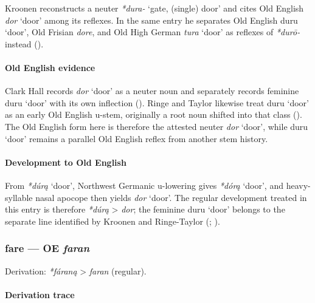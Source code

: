 \documentclass[
  british,
  a4paper,
]{article}
\providecommand{\Recon}[1]{\emph{*#1}}
\begin{document}
Kroonen reconstructs a neuter \emph{*dura-} `gate, (single) door' and
cites Old English {\emph{dor}} `door' among its reflexes. In the same
entry he separates Old English {duru} `door', Old Frisian \emph{dore},
and Old High German {\emph{tura}} `door' as reflexes of \emph{*durō-}
instead ().

\paragraph{Old English evidence}\label{old-english-evidence-16}

Clark Hall records {\emph{dor}} `door' as a neuter noun and separately
records feminine {duru} `door' with its own inflection
(). Ringe and Taylor
likewise treat {duru} `door' as an early Old English u-stem, originally
a root noun shifted into that class
(). The Old English
form here is therefore the attested neuter {\emph{dor}} `door', while
{duru} `door' remains a parallel Old English reflex from another stem
history.

\paragraph{Development to Old
English}\label{development-to-old-english-16}

From \Recon{dúrą} `door', Northwest Germanic u-lowering gives
\Recon{dórą} `door', and heavy-syllable nasal apocope then yields
{\emph{dor}} `door'. The regular development treated in this entry is
therefore \emph{*dúrą} \textgreater{} \emph{dor}; the feminine {duru}
`door' belongs to the separate line identified by Kroonen and
Ringe-Taylor (;
).

\subsubsection{\texorpdfstring{fare --- OE
\emph{faran}}{fare --- OE faran}}\label{fare-oe-faran}

Derivation: \emph{*fáraną} \textgreater{} \emph{faran} (regular).

\paragraph{Derivation trace}\label{derivation-trace-20}
\end{document}
